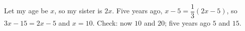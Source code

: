 Let my age be $x$, so my sister is $2x$. Five years ago, $x-5=\dfrac13(2x-5)$, so $3x-15=2x-5$ and $x=\boxed{10}$. Check: now $10$ and $20$; five years ago $5$ and $15$.
